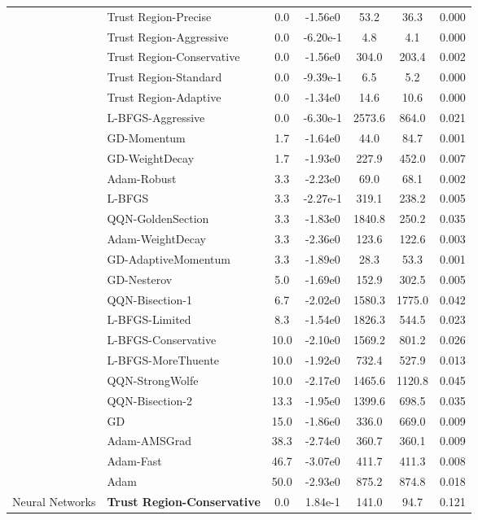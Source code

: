 \documentclass{article}
\begin{document}
\begin{table}[htbp]
{\begin{tabular}{p{2.5cm}p{2.5cm}*{5}{c}}
 & Trust Region-Precise & 0.0 & -1.56e0 & 53.2 & 36.3 & 0.000 \\
 & Trust Region-Aggressive & 0.0 & -6.20e-1 & 4.8 & 4.1 & 0.000 \\
 & Trust Region-Conservative & 0.0 & -1.56e0 & 304.0 & 203.4 & 0.002 \\
 & Trust Region-Standard & 0.0 & -9.39e-1 & 6.5 & 5.2 & 0.000 \\
 & Trust Region-Adaptive & 0.0 & -1.34e0 & 14.6 & 10.6 & 0.000 \\
 & L-BFGS-Aggressive & 0.0 & -6.30e-1 & 2573.6 & 864.0 & 0.021 \\
 & GD-Momentum & 1.7 & -1.64e0 & 44.0 & 84.7 & 0.001 \\
 & GD-WeightDecay & 1.7 & -1.93e0 & 227.9 & 452.0 & 0.007 \\
 & Adam-Robust & 3.3 & -2.23e0 & 69.0 & 68.1 & 0.002 \\
 & L-BFGS & 3.3 & -2.27e-1 & 319.1 & 238.2 & 0.005 \\
 & QQN-GoldenSection & 3.3 & -1.83e0 & 1840.8 & 250.2 & 0.035 \\
 & Adam-WeightDecay & 3.3 & -2.36e0 & 123.6 & 122.6 & 0.003 \\
 & GD-AdaptiveMomentum & 3.3 & -1.89e0 & 28.3 & 53.3 & 0.001 \\
 & GD-Nesterov & 5.0 & -1.69e0 & 152.9 & 302.5 & 0.005 \\
 & QQN-Bisection-1 & 6.7 & -2.02e0 & 1580.3 & 1775.0 & 0.042 \\
 & L-BFGS-Limited & 8.3 & -1.54e0 & 1826.3 & 544.5 & 0.023 \\
 & L-BFGS-Conservative & 10.0 & -2.10e0 & 1569.2 & 801.2 & 0.026 \\
 & L-BFGS-MoreThuente & 10.0 & -1.92e0 & 732.4 & 527.9 & 0.013 \\
 & QQN-StrongWolfe & 10.0 & -2.17e0 & 1465.6 & 1120.8 & 0.045 \\
 & QQN-Bisection-2 & 13.3 & -1.95e0 & 1399.6 & 698.5 & 0.035 \\
 & GD & 15.0 & -1.86e0 & 336.0 & 669.0 & 0.009 \\
 & Adam-AMSGrad & 38.3 & -2.74e0 & 360.7 & 360.1 & 0.009 \\
 & Adam-Fast & 46.7 & -3.07e0 & 411.7 & 411.3 & 0.008 \\
 & Adam & 50.0 & -2.93e0 & 875.2 & 874.8 & 0.018 \\
\midrule
\multirow{25}{*}{Neural Networks} & \textbf{Trust Region-Conservative} & 0.0 & 1.84e-1 & 141.0 & 94.7 & 0.121 \\

\end{tabular}}
\end{table}
\end{document}
